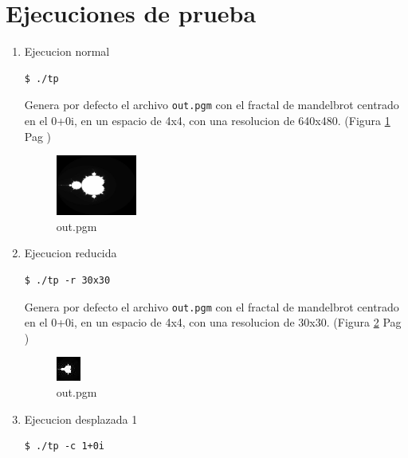 \documentclass[10pt,spanish,a4paper,openany,notitlepage]{article}
\begin{document}
\section{Ejecuciones de prueba}

\begin{enumerate}

\item Ejecucion normal 
\begin{framed}
\begin{verbatim}$ ./tp \end{verbatim}
\end{framed}

Genera por defecto el archivo \texttt{out.pgm} con el fractal de mandelbrot centrado en el 0+0i, en un espacio de 4x4, con una resolucion de 640x480. (Figura \ref{test1} Pag \pageref{test1})

\begin{figure}[hbt]
\centering
\includegraphics[width=0.25\textwidth]{out.jpg}
\caption{out.pgm}
\label{test1}
\end{figure}

\item Ejecucion reducida
\begin{framed}
\begin{verbatim}$ ./tp -r 30x30 \end{verbatim}
\end{framed}

Genera por defecto el archivo \texttt{out.pgm} con el fractal de mandelbrot centrado en el 0+0i, en un espacio de 4x4, con una resolucion de 30x30. (Figura \ref{test2} Pag \pageref{test2})

\begin{figure}[hbt]
\centering
\includegraphics[]{out2.jpg}
\caption{out.pgm}
\label{test2}
\end{figure}

\item Ejecucion desplazada 1
\begin{framed}
\begin{verbatim}$ ./tp -c 1+0i \end{verbatim}
\end{framed}


\end{enumerate}
\end{document}
